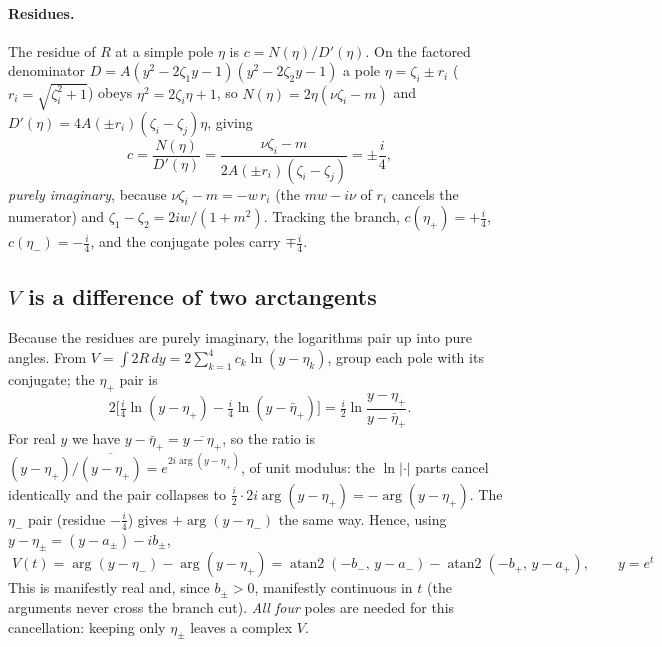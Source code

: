 \documentclass[11pt]{article}
\numberwithin{equation}{section}
\DeclareMathOperator{\atantwo}{atan2}
\begin{document}
\paragraph{Residues.} The residue of $R$ at a simple pole $\eta$ is $c=N(\eta)/D'(\eta)$. On the
factored denominator $D=A(y^2-2\zeta_1y-1)(y^2-2\zeta_2y-1)$ a pole $\eta=\zeta_i\pm r_i$
($r_i=\sqrt{\zeta_i^2+1}$) obeys $\eta^2=2\zeta_i\eta+1$, so $N(\eta)=2\eta(\nu\zeta_i-m)$ and
$D'(\eta)=4A(\pm r_i)(\zeta_i-\zeta_j)\eta$, giving
\begin{equation}\label{eq:res}
  c=\frac{N(\eta)}{D'(\eta)}=\frac{\nu\zeta_i-m}{2A(\pm r_i)(\zeta_i-\zeta_j)}=\pm\frac{i}{4} ,
\end{equation}
\emph{purely imaginary}, because $\nu\zeta_i-m=-w\,r_i$ (the $mw-i\nu$ of $r_i$ cancels the numerator)
and $\zeta_1-\zeta_2=2iw/(1+m^2)$. Tracking the branch, $c(\eta_+)=+\tfrac i4$, $c(\eta_-)=-\tfrac i4$,
and the conjugate poles carry $\mp\tfrac i4$.

\subsection{\texorpdfstring{$V$}{V} is a difference of two arctangents}
Because the residues are purely imaginary, the logarithms pair up into pure angles. From
$V=\int2R\,dy=2\sum_{k=1}^4 c_k\ln(y-\eta_k)$, group each pole with its conjugate; the $\eta_+$ pair is
\[
  2\Big[\tfrac i4\ln(y-\eta_+)-\tfrac i4\ln(y-\bar\eta_+)\Big]
  =\tfrac i2\ln\frac{y-\eta_+}{y-\bar\eta_+} .
\]
For real $y$ we have $y-\bar\eta_+=\overline{y-\eta_+}$, so the ratio is
$(y-\eta_+)/\overline{(y-\eta_+)}=e^{2i\arg(y-\eta_+)}$, of unit modulus: the $\ln|\cdot|$ parts cancel
identically and the pair collapses to $\tfrac i2\cdot2i\arg(y-\eta_+)=-\arg(y-\eta_+)$. The $\eta_-$
pair (residue $-\tfrac i4$) gives $+\arg(y-\eta_-)$ the same way. Hence, using
$y-\eta_\pm=(y-a_\pm)-ib_\pm$,
\begin{equation}\label{eq:V}
  \boxed{\;V(t)=\arg(y-\eta_-)-\arg(y-\eta_+)
  =\atantwo(-b_-,\,y-a_-)-\atantwo(-b_+,\,y-a_+),\qquad y=e^t\;}
\end{equation}
This is manifestly real and, since $b_\pm>0$, manifestly continuous in $t$ (the arguments never cross
the branch cut). \emph{All four} poles are needed for this cancellation: keeping only $\eta_\pm$ leaves
a complex $V$.
\end{document}
